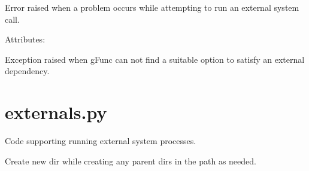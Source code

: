 \documentclass[letterpaper,10pt,english]{sphinxmanual}
\begin{document}
\begin{fulllineitems}
\label{code:gfunc.errors.SystemCallError}
Error raised when a problem occurs while attempting to run an external system call.
\begin{description}
\item[{Attributes:}] \leavevmode
{}

\end{description}

\begin{fulllineitems}
\label{code:gfunc.errors.SystemCallError.__init__}
\end{fulllineitems}


\end{fulllineitems}


\begin{fulllineitems}
\label{code:gfunc.errors.UnsatisfiedDependencyError}
Exception raised when gFunc can not find a suitable option to satisfy an external dependency.

\end{fulllineitems}

\label{code:module-gfunc.externals}

\section{externals.py}
\label{code:externals-py}
Code supporting running external system processes.

\begin{fulllineitems}
\label{code:gfunc.externals.mkdirp}
Create new dir while creating any parent dirs in the path as needed.

\end{fulllineitems}
\end{document}
